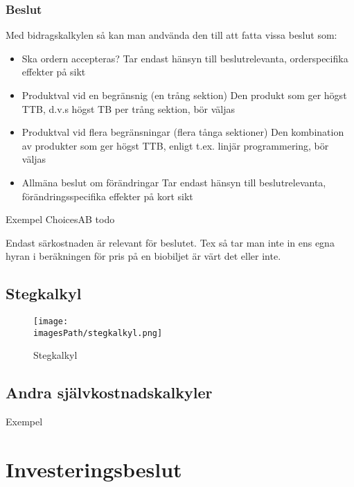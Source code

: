 \subsubsection{Beslut}
Med bidragskalkylen så kan man andvända den till att fatta vissa beslut som:
\begin{itemize}
    \item Ska ordern accepteras? \newline
    Tar endast hänsyn till beslutrelevanta, orderspecifika effekter på sikt
    \item Produktval vid en begränsnig (en trång sektion) \newline
    Den produkt som ger högst TTB, d.v.s högst TB per trång sektion, bör väljas
    \item Produktval vid flera begränsningar (flera tånga sektioner) \newline
    Den kombination av produkter som ger högst TTB, enligt t.ex. linjär programmering, bör väljas
    \item Allmäna beslut om förändringar \newline
    Tar endast hänsyn till beslutrelevanta, förändringsspecifika effekter på kort sikt
\end{itemize}


\begin{exampleblock}{Exempel ChoicesAB}
    todo
    
    Endast särkostnaden är relevant för beslutet. Tex så tar man inte in ens egna hyran i 
    beräkningen för pris på en biobiljet är värt det eller inte.
\end{exampleblock}

\subsection{Stegkalkyl}
\begin{figure}[!h]
    \centering
    \texttt{[image: \\imagesPath/stegkalkyl.png]}
    \caption{Stegkalkyl}
\end{figure}


\subsection{Andra självkostnadskalkyler}
Exempel

\section{Investeringsbeslut}

